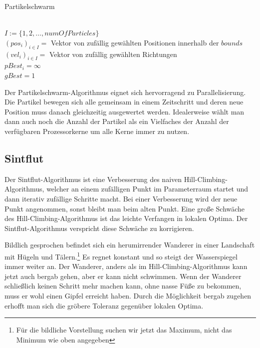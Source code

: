 \documentclass[a4paper,12pt]{article}
\begin{document}
\begin{algorithm}
\caption{Partikelschwarm}
\begin{algorithmic}
\\


$I := \{1,2,\hdots,numOfParticles\}$\\
$(pos_i)_{i\in I} =$ Vektor von zufällig gewählten Positionen innerhalb der $bounds$\\
$(vel_i)_{i\in I} =$ Vektor von zufällig gewählten Richtungen\\

$pBest_i = \infty$\\
$gBest = 1$\\

\While{}

\EndWhile	
\EndFunction	
\end{algorithmic}
\end{algorithm}


%

Der Partikelschwarm-Algorithmus eignet sich hervorragend zu Parallelisierung. Die Partikel bewegen sich alle gemeinsam in einem Zeitschritt und deren neue Position muss danach gleichzeitig ausgewertet werden. Idealerweise wählt man dann auch noch die Anzahl der Partikel als ein Vielfaches der Anzahl der verfügbaren Prozessorkerne um alle Kerne immer zu nutzen.

\subsection{Sintflut}

Der Sintflut-Algorithmus ist eine Verbesserung des naiven Hill-Climbing-Algorithmus, welcher an einem zufälligen Punkt im Parameterraum startet und dann iterativ zufällige Schritte macht. Bei einer Verbesserung wird der neue Punkt angenommen, sonst bleibt man beim alten Punkt. Eine große Schwäche des Hill-Climbing-Algorithmus ist das leichte Verfangen in lokalen Optima. Der Sintflut-Algorithmus verspricht diese Schwäche zu korrigieren.

Bildlich gesprochen befindet sich ein herumirrender Wanderer in einer Landschaft mit Hügeln und Tälern.\footnote{Für die bildliche Vorstellung suchen wir jetzt das Maximum, nicht das Minimum wie oben angegeben} Es regnet konstant und so steigt der Wasserspiegel immer weiter an. Der Wanderer, anders als im Hill-Climbing-Algorithmus kann jetzt auch bergab gehen, aber er kann nicht schwimmen. Wenn der Wanderer schließlich keinen Schritt mehr machen kann, ohne nasse Füße zu bekommen, muss er wohl einen Gipfel erreicht haben. Durch die Möglichkeit bergab zugehen erhofft man sich die gröbere Toleranz gegenüber lokalen Optima.
\end{document}
